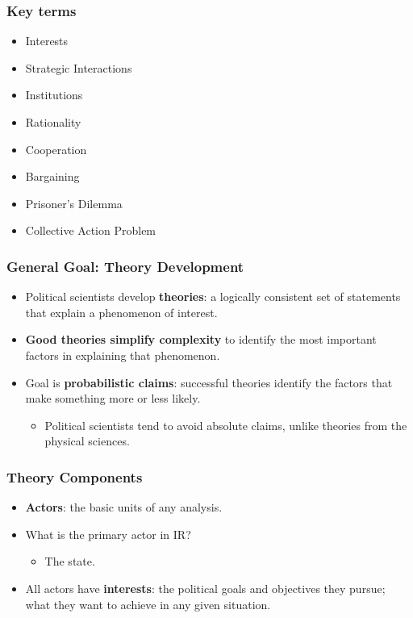 \documentclass[handout]{beamer}
\begin{document}
\begin{frame} 
	\frametitle{\LARGE{Key terms}}
	\begin{itemize}
		\item Interests
		\item Strategic Interactions
		\item Institutions
		\item Rationality
		\item Cooperation
		\item Bargaining
		\item Prisoner's Dilemma
		\item Collective Action Problem
	\end{itemize}
\end{frame}

\begin{frame} 
	\frametitle{\LARGE{General Goal: Theory Development}}
	\begin{itemize}
		\item Political scientists develop \textbf{theories}: a logically consistent set of statements that explain a phenomenon of interest. \pause
		\item \textbf{Good theories simplify complexity} to identify the most important factors in explaining that phenomenon. \pause
		\item Goal is \textbf{probabilistic claims}: successful theories identify the factors that make something more or less likely. 
		\begin{itemize}
			\item Political scientists tend to avoid absolute claims, unlike theories from the physical sciences.
		\end{itemize}	
	\end{itemize}
\end{frame}

\begin{frame} 
	\frametitle{\LARGE{Theory Components}}
	\begin{itemize}
		\item \textbf{Actors}: the basic units of any analysis.  \pause
		\item What is the primary actor in IR? \pause
		\begin{itemize}
			\item The state.
		\end{itemize}
		\item All actors have \textbf{interests}: the political goals and objectives they pursue; what they want to achieve in any given situation.
	\end{itemize}
\end{frame}
\end{document}
